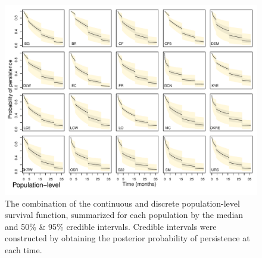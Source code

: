\documentclass[12pt, oneside]{article}   	%
\begin{document}
 \begin{figure}[!h]
   \centering
       \includegraphics[page=1,width=1\textwidth]{../../figures/survival-function-compound.pdf}  
    \caption{ The combination of the continuous and discrete population-level survival function, summarized for each population by the median and 50\% \& 95\% credible intervals. Credible intervals were constructed by obtaining the posterior probability of persistence at each time. }
 \label{fig:viability-estimates-population}
\end{figure}
\end{document}
